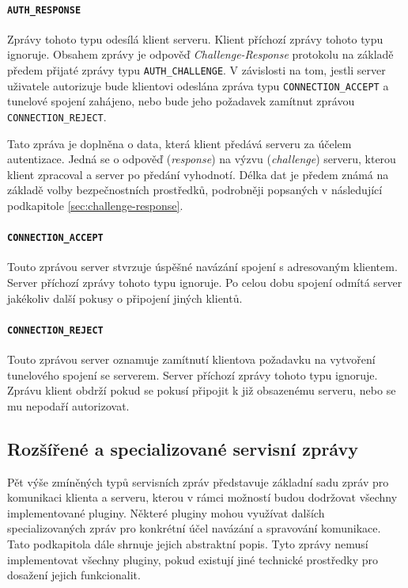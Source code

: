 \documentclass[thesis=M,czech]{FITthesis}[2012/10/20]
\begin{document}
  \paragraph{\texttt{AUTH\_RESPONSE}}
  
    Zprávy tohoto typu odesílá klient serveru. Klient příchozí zprávy tohoto typu ignoruje. Obsahem zprávy je odpověď \textit{Challenge-Response} protokolu na základě předem přijaté zprávy typu \texttt{AUTH\_CHALLENGE}. V závislosti na tom, jestli server uživatele autorizuje bude klientovi odeslána zpráva typu \texttt{CONNECTION\_ACCEPT} a tunelové spojení zahájeno, nebo bude jeho požadavek zamítnut zprávou \texttt{CONNECTION\_REJECT}.
    
    Tato zpráva je doplněna o data, která klient předává serveru za účelem autentizace. Jedná se o odpověď (\textit{response}) na výzvu (\textit{challenge}) serveru, kterou klient zpracoval a server po předání vyhodnotí. Délka dat je předem známá na základě volby bezpečnostních prostředků, podrobněji popsaných v následující podkapitole \ref{sec:challenge-response}.
    
  \paragraph{\texttt{CONNECTION\_ACCEPT}}
  
    Touto zprávou server stvrzuje úspěšné navázání spojení s adresovaným klientem. Server příchozí zprávy tohoto typu ignoruje. Po celou dobu spojení odmítá server jakékoliv další pokusy o připojení jiných klientů.
    
  \paragraph{\texttt{CONNECTION\_REJECT}}
    
    Touto zprávou server oznamuje zamítnutí klientova požadavku na vytvoření tunelového spojení se serverem. Server příchozí zprávy tohoto typu ignoruje. Zprávu klient obdrží pokud se pokusí připojit k již obsazenému serveru, nebo se mu nepodaří autorizovat.
    

\subsection{Rozšířené a specializované servisní zprávy}
    
Pět výše zmíněných typů servisních zpráv představuje základní sadu zpráv pro komunikaci klienta a serveru, kterou v rámci možností budou dodržovat všechny implementované pluginy. Některé pluginy mohou využívat dalších specializovaných zpráv pro konkrétní účel navázání a spravování komunikace. Tato podkapitola dále shrnuje jejich abstraktní popis. Tyto zprávy nemusí implementovat všechny pluginy, pokud existují jiné technické prostředky pro dosažení jejich funkcionalit.
\end{document}
